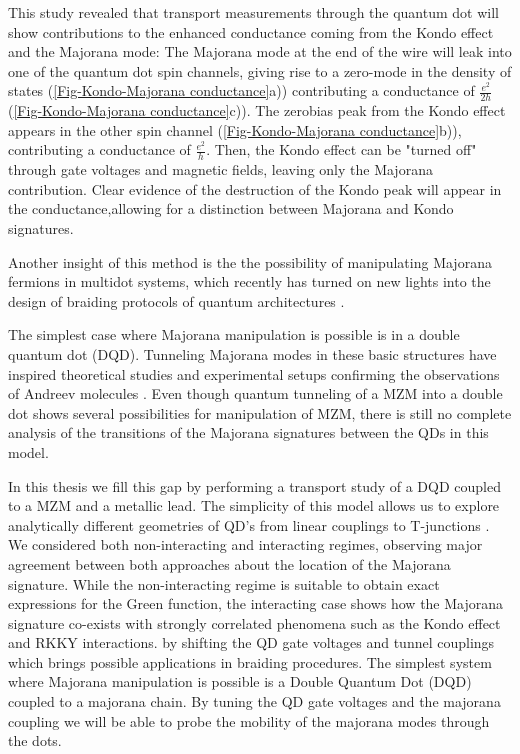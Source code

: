 This study revealed that transport measurements
through the quantum dot will show contributions to the enhanced conductance
coming from the Kondo effect and the Majorana mode: The Majorana mode
at the end of the wire will leak into one of the quantum dot spin channels,
giving rise to a zero-mode in the density of states
(\ref{Fig-Kondo-Majorana conductance}a)) contributing a conductance
of $\frac{e^{2}}{2h}$(\ref{Fig-Kondo-Majorana conductance}c)). The
zero\textendash bias peak from the Kondo effect appears in the other
spin channel (\ref{Fig-Kondo-Majorana conductance}b)), contributing
a conductance of $\frac{e^{2}}{h}$. Then, the Kondo effect can be
"turned off" through gate voltages
and magnetic fields, leaving only the Majorana contribution. Clear
evidence of the destruction of the Kondo peak will appear in the conductance,allowing for a distinction between Majorana and Kondo signatures.

 Another insight of this method is the the possibility of manipulating  Majorana fermions  in multidot systems, which recently has turned on new lights into the design of braiding protocols \cite{malciu_braiding_2018}
 of quantum architectures \cite{plugge_majorana_2017,karzig_scalable_2017,barkeshli_physical_2015}.

  The simplest case where Majorana manipulation is possible is in a double quantum dot (DQD). Tunneling Majorana modes in these basic structures have inspired theoretical studies \cite{silva_andreev_2016,ivanov_coherent_2017}
 and experimental setups confirming the observations of Andreev molecules \cite{su_andreev_2017}. Even though quantum tunneling of a MZM into a double dot shows several possibilities for manipulation of MZM,  there is still no complete analysis of the transitions of the Majorana signatures between the QDs in this model.

   In this thesis we fill this gap by performing a transport study of a DQD coupled to a MZM and a metallic lead. The simplicity of this model allows us to explore analytically different geometries of QD's from linear couplings to T-junctions . We considered both non-interacting and interacting regimes, observing major agreement between both approaches about the location of the Majorana signature. While the non-interacting regime is suitable to obtain exact expressions for the Green function, the interacting case  shows how the Majorana signature co-exists with strongly correlated phenomena such as the Kondo effect  and RKKY interactions.   \cite{ruderman_indirect_1954,kasuya_theory_1956,yosida_magnetic_1957} 
  by shifting the QD gate voltages and tunnel couplings which brings possible applications in  braiding procedures. The simplest system where Majorana manipulation is possible is  a  Double Quantum Dot (DQD) coupled to a majorana chain. By tuning the QD gate voltages and the majorana coupling we will be able to probe the mobility of the majorana modes through the dots.
 
